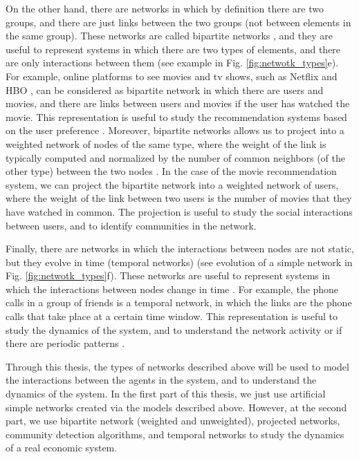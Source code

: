 On the other hand, there are networks in which by definition there are two groups, and there are just links between the two groups (not between elements in the same group). These networks are called bipartite networks \cite{newman2001structure}, and they are useful to represent systems in which there are two types of elements, and there are only interactions between them \cite{latapy-2008} (see example in Fig. \ref{fig:netwotk_types}e). For example, online platforms to see movies and tv shows, such as Netflix \cite{netflix} and HBO \cite{HBO}, can be considered as bipartite network in which there are users and movies, and there are links between users and movies if the user has watched the movie. This representation is useful to study the recommendation systems based on the user preference \cite{ricci-2011}. Moreover, bipartite networks allows us to project into a weighted network of nodes of the same type, where the weight of the link is typically computed and normalized by the number of common neighbors (of the other type) between the two nodes \cite{newman-2001-collaboration}. In the case of the movie recommendation system, we can project the bipartite network into a weighted network of users, where the weight of the link between two users is the number of movies that they have watched in common. The projection is useful to study the social interactions between users, and to identify communities in the network.

Finally, there are networks in which the interactions between nodes are not static, but they evolve in time (temporal networks) \cite{Holme2012Temporal} (see evolution of a simple network in Fig. \ref{fig:netwotk_types}f). These networks are useful to represent systems in which the interactions between nodes change in time \cite{Perra2012ActivityDriven}. For example, the phone calls in a group of friends is a temporal network, in which the links are the phone calls that take place at a certain time window. This representation is useful to study the dynamics of the system, and to understand the network activity \cite{karsai-2011} or if there are periodic patterns \cite{Jo2012Circadian}.

Through this thesis, the types of networks described above will be used to model the interactions between the agents in the system, and to understand the dynamics of the system. In the first part of this thesis, we just use artificial simple networks created via the models described above. However, at the second part, we use bipartite network (weighted and unweighted), projected networks, community detection algorithms, and temporal networks to study the dynamics of a real economic system. 

